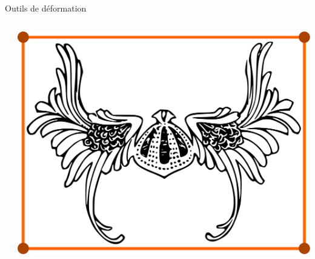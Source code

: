 \documentclass[xcolor=x11names,compress]{beamer}
\renewcommand{\(}{\begin{columns}} \renewcommand{\)}{\end{columns}}
\newcommand{\<}[1]{\begin{column}{#1}} \renewcommand{\>}{\end{column}}
\begin{document}
\begin{frame}{Outils de déformation}
\begin{columns}[t]
\begin{column}{0.3\textwidth}
    \end{column}
    \begin{column}{0.3\textwidth}
      \centering
      \includegraphics[scale=0.12]{Outil-Mono-Surfaces}
    \end{column}
  \end{columns} 
\end{frame}
\end{document}
